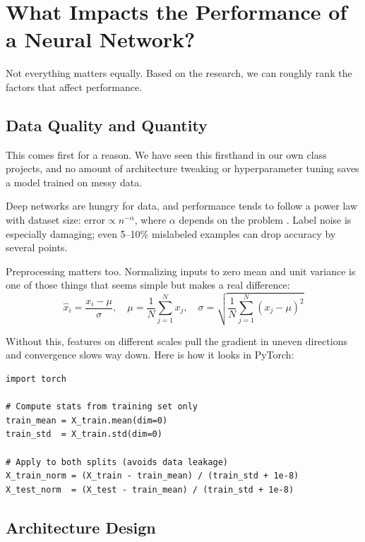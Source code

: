 \documentclass[12pt, letterpaper]{article}
\begin{document}
\section{What Impacts the Performance of a Neural Network?}

Not everything matters equally. Based on the research, we can roughly rank the factors that affect performance.

\subsection{Data Quality and Quantity}

This comes first for a reason. We have seen this firsthand in our own class projects, and no amount of architecture tweaking or hyperparameter tuning saves a model trained on messy data.

Deep networks are hungry for data, and performance tends to follow a power law with dataset size: $\text{error} \propto n^{-\alpha}$, where $\alpha$ depends on the problem \cite{hestness2017deep}. Label noise is especially damaging; even 5--10\% mislabeled examples can drop accuracy by several points.

Preprocessing matters too. Normalizing inputs to zero mean and unit variance is one of those things that seems simple but makes a real difference:
\begin{equation}
    \hat{x}_i = \frac{x_i - \mu}{\sigma}, \quad \mu = \frac{1}{N}\sum_{j=1}^{N} x_j, \quad \sigma = \sqrt{\frac{1}{N}\sum_{j=1}^{N}(x_j - \mu)^2}
\end{equation}

Without this, features on different scales pull the gradient in uneven directions and convergence slows way down. Here is how it looks in PyTorch:

\noindent\begin{minipage}{\linewidth}
\begin{lstlisting}[caption={Data normalization in PyTorch}]
import torch

# Compute stats from training set only
train_mean = X_train.mean(dim=0)
train_std  = X_train.std(dim=0)

# Apply to both splits (avoids data leakage)
X_train_norm = (X_train - train_mean) / (train_std + 1e-8)
X_test_norm  = (X_test - train_mean) / (train_std + 1e-8)
\end{lstlisting}
\end{minipage}

\subsection{Architecture Design}
\end{document}
